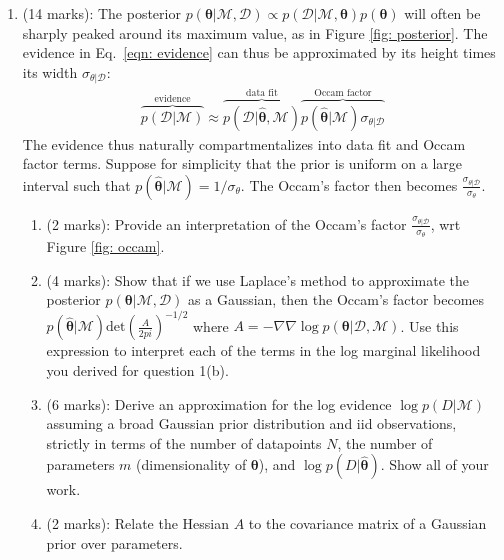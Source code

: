 \documentclass[11pt]{article}
\newcommand{\mbf}[1]{{\boldsymbol{\mathbf{#1}}}}
\renewcommand{\bm}{\mbf}
\begin{document}
\begin{enumerate}




\item (14 marks): The posterior $p(\bm{\theta} | \mathcal{M}, \mathcal{D}) \propto p(\mathcal{D} | \mathcal{M}, \bm{\theta}) p(\bm{\theta})$ will often be sharply peaked around its maximum value, as in Figure \ref{fig: posterior}.  The evidence in Eq.~\eqref{eqn: evidence} can thus be approximated by its height times its width $\sigma_{\theta | \mathcal{D}}$:
\begin{align}
\overbrace{p(\mathcal{D} | \mathcal{M})}^{\text{evidence}} \approx \overbrace{p(\mathcal{D} | \hat{\bm{\theta}}, \mathcal{M})}^{\text{data fit}} \overbrace{p(\hat{\bm{\theta}} | \mathcal{M}) \sigma_{\theta | \mathcal{D}}}^{\text{Occam factor}}
\end{align}
The evidence thus naturally compartmentalizes into data fit and Occam factor terms.  Suppose for simplicity that the prior is uniform on a large interval such that $p(\hat{\bm{\theta}} | \mathcal{M}) = 1/\sigma_{\theta}$.  The Occam's 
factor then becomes $\frac{\sigma_{\theta|\mathcal{D}}}{\sigma_{\theta}}$. 
\begin{enumerate}[label=(\alph*)]
\item (2 marks): Provide an interpretation of the Occam's factor $\frac{\sigma_{\theta|\mathcal{D}}}{\sigma_{\theta}}$, wrt Figure \ref{fig: occam}.
\item (4 marks): Show that if we use Laplace's method to approximate the posterior $p(\bm{\theta} | \mathcal{M}, \mathcal{D})$ 
as a Gaussian, then the Occam's factor becomes 
$p(\hat{\bm{\theta}} | \mathcal{M}) \text{det}(\frac{A}{2pi})^{-1/2}$ where $A = -\nabla \nabla \log p(\bm{\theta} | \mathcal{D},\mathcal{M})$.  Use this expression to interpret each of the terms in the log marginal likelihood you derived for question 1(b).
\item (6 marks): Derive an approximation for the log evidence $\log p(D | \mathcal{M})$ assuming a broad Gaussian prior distribution and iid observations, strictly in terms of the number of datapoints $N$, the number of parameters $m$ (dimensionality of $\bm{\theta}$), and 
$\log p(D | \hat{\bm{\theta}})$.  Show all of your work.
\item (2 marks): Relate the Hessian $A$ to the covariance matrix of a Gaussian prior over parameters.
\end{enumerate}



\end{enumerate}
\end{document}

